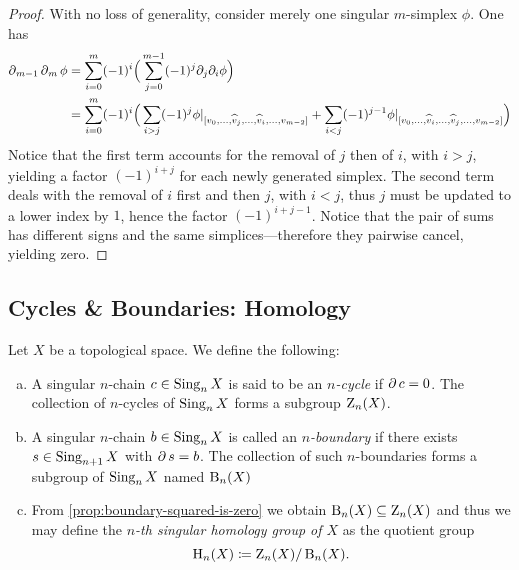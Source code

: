 \begin{proof}
    With no loss of generality, consider merely one singular \(m\)-simplex
    \(\phi\). One has
    \begin{align*}
        \operatorname{\partial}_{m-1} \operatorname{\partial}_m \phi
         & = \sum_{i=0}^m (-1)^i
        \Big( \sum_{j=0}^{m-1} (-1)^j \partial_j \partial_i \phi \Big) \\
         & = \sum_{i=0}^m (-1)^i
        \Big(
        \sum_{i > j} (-1)^j
        \phi|_{[v_0, \dots, \widehat v_j, \dots, \widehat v_i, \dots, v_{m-2}]}
        + \sum_{i < j} (-1)^{j-1}
        \phi|_{[v_0, \dots, \widehat v_i, \dots, \widehat v_j, \dots, v_{m-2}]}
        \Big)                                                          \\
    \end{align*}
    Notice that the first term accounts for the removal of \(j\) then of \(i\), with
    \(i > j\), yielding a factor \((-1)^{i + j}\) for each newly generated
    simplex. The second term deals with the removal of \(i\) first and then \(j\),
    with \(i < j\), thus \(j\) must be updated to a lower index by \(1\), hence the
    factor \((-1)^{i + j - 1}\). Notice that the pair of sums has different signs
    and the same simplices---therefore they pairwise cancel, yielding zero.
\end{proof}

\subsection{Cycles \& Boundaries: Homology}

\begin{definition}
    \label{def:cycle-boundary-homology}
    Let \(X\) be a topological space. We define the following:
    \begin{enumerate}[(a)]\setlength\itemsep{0em}
        \item A singular \(n\)-chain \(c \in \operatorname{Sing}_n X\) is said to be an
              \emph{\(n\)-cycle} if \(\operatorname{\partial} c = 0\). The collection of \(n\)-cycles of
              \(\operatorname{Sing}_n X\) forms a subgroup \(\operatorname{Z}_n(X)\).

        \item A singular \(n\)-chain \(b \in \operatorname{Sing}_n X\) is called an
              \emph{\(n\)-boundary} if there exists \(s \in \operatorname{Sing}_{n+1} X\) with
              \(\operatorname{\partial} s = b\). The collection of such \(n\)-boundaries forms a subgroup of
              \(\operatorname{Sing}_n X\) named \(\operatorname{B}_n(X)\)

        \item From \cref{prop:boundary-squared-is-zero} we obtain
              \(\operatorname{B}_n(X) \subseteq \operatorname{Z}_n(X)\) and thus we may define the \emph{\(n\)-th
                  singular homology group of \(X\)} as the quotient group
              \[
                  \operatorname{H}_n(X) \coloneq \operatorname{Z}_n(X) / \operatorname{B}_n(X).
              \]
    \end{enumerate}
\end{definition}


